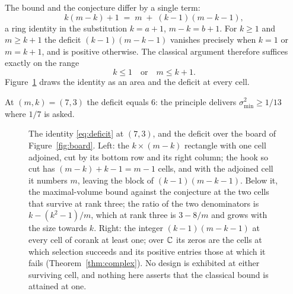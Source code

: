 The bound and the conjecture differ by a single term:
\begin{equation}\label{eq:deficit}
  k(m-k)+1\;=\;m\;+\;(k-1)(m-k-1),
\end{equation}
a ring identity in the substitution $k=a+1$, $m-k=b+1$.  For $k\ge1$ and
$m\ge k+1$ the deficit $(k-1)(m-k-1)$ vanishes precisely when $k=1$ or
$m=k+1$, and is positive otherwise.  The classical argument therefore
suffices exactly on the range
\begin{equation}\label{eq:elementary}
  k\le1\quad\text{or}\quad m\le k+1 .
\end{equation}
Figure~\ref{fig:deficit} draws the identity as an area and the deficit at
every cell.

At $(m,k)=(7,3)$ the deficit equals $6$: the principle delivers
$\sigma_{\min}^2\ge1/13$ where $1/7$ is asked.

\begin{figure}[ht]
  \centering
  
  \caption{The identity \eqref{eq:deficit} at $(7,3)$, and the deficit over
  the board of Figure~\ref{fig:board}.  Left: the $k\times(m-k)$ rectangle
  with one cell adjoined, cut by its bottom row and its right column; the
  hook so cut has $(m-k)+k-1=m-1$ cells, and with the adjoined cell it
  numbers $m$, leaving the block of $(k-1)(m-k-1)$.  Below it, the
  maximal-volume bound against the conjecture at the two cells that survive
  at rank three; the ratio of the two denominators is $k-(k^2-1)/m$, which
  at rank three is $3-8/m$ and grows with the size towards $k$.  Right: the
  integer $(k-1)(m-k-1)$ at every cell of corank at least one; over $\mathbb{C}$ its
  zeros are the cells at which selection succeeds and its positive entries
  those at which it fails (Theorem~\ref{thm:complex}).  No design is
  exhibited at either surviving cell, and nothing here asserts that the
  classical bound is attained at one.}
  \label{fig:deficit}
\end{figure}

